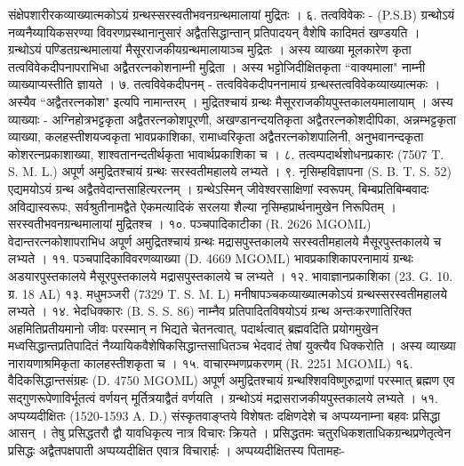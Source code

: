 संक्षेपशारीरकव्याख्यात्मकोऽयं ग्रन्थस्सरस्वतीभवनग्रन्थमालायां मुद्रितः ।
६. तत्वविवेकः - (P.S.B)
ग्रन्थोऽयं नव्यनैय्यायिकसरण्या विवरणप्रस्थानानुसारं अद्वैतसिद्धान्तान् प्रतिपादयन् वैशेषि कादिमतं खण्डयति । ग्रन्थोऽयं पण्डितग्रन्थमालायां मैसूरराजकीयग्रन्थमालायाञ्च मुद्रितः । अस्य व्याख्या मूलकारेण कृता तत्वविवेकदीपनापराभिधा अद्वैतरत्नकोशनाम्नी मुद्रिता । अस्य भट्टोजिदीक्षितकृता ``वाक्यमाला" नाम्नी व्याख्याप्यस्तीति ज्ञायते ।
७. तत्वविवेकदीपनम् -
तत्वविवेकदीपननामायं ग्रन्थस्तत्वविवेकव्याख्यात्मकः । अस्यैव ``अद्वैतरत्नकोश" इत्यपि नामान्तरम् । मुद्रितश्चायं ग्रन्थः मैसूरराजकीयपुस्तकालयमालायाम् । अस्य व्याख्याः - अग्निहोत्रभट्टकृता अद्वैतरत्नकोशपूरणी, अखण्डानन्दयतिकृता अद्वैतरत्नकोशदीपिका, अन्नम्भट्टकृता व्याख्या, कलहस्तीशयज्वकृता भावप्रकाशिका, रामाध्वरिकृता अद्वैतरत्नकोशपालिनी, अनुभवानन्दकृता कोशरत्नप्रकाशाख्या, शाश्वतानन्दतीर्थकृता भावार्थप्रकाशिका च ।
८. तत्वम्पदार्थशोधनप्रकारः (7507 T. S. M. L.) अपूर्ण अमुद्रितश्चायं ग्रन्थः सरस्वतीमहालये लभ्यते ।
९. नृसिम्हविज्ञापना (S. B. T. S. 52)
एद्यमयोऽयं ग्रन्थ अद्वैतवेदान्तसाहित्यरत्नम् । ग्रन्थेऽस्मिन् जीवेश्वरसाक्षिणां स्वरूपम्, बिम्बप्रतिबिम्बवादः अविद्यास्वरूपः, सर्वश्रुतीनामद्वैते ऐकमत्यादिकं सरलया शैल्या नृसिम्हप्रार्थनामुखेन निरूपितम् । सरस्वतीभवनग्रन्थमालायां मुद्रितश्च ।
१०. पञ्चपादिकाटीका (R. 2626 MGOML)
वेदान्तरत्नकोशापराभिध अपूर्ण अमुद्रितश्चायं ग्रन्थः मद्रासपुस्तकालये सरस्वतीमहालये मैसूरपुस्तकालये च लभ्यते ।
११. पञ्चपादिकाविवरणव्याख्या (D. 4669 MGOML)
भावप्रकाशिकापरनामायं ग्रन्थः अडयारपुस्तकालये मैसूरपुस्तकालये मद्रासपुस्तकालये च लभ्यते ।
१२. भावाज्ञानप्रकाशिका (23. G. 10. ग्र. 18 AL)
१३. मधुमञ्जरी (7329 T. S. M. L)
मनीषापञ्चकव्याख्यात्मकोऽयं ग्रन्थस्सरस्वतीमहालये लभ्यते ।
१४. भेदधिक्कारः (B. S. S. 86)
नाम्नैव प्रतिपादितविषयोऽयं ग्रन्थ अन्तःकरणातिरिक्त अहमितिप्रतीयमानो जीवः परस्मान् न भिद्यते चेतनत्वात्, पदार्थत्वात् ब्रह्मवदिति प्रयोगमुखेन मध्वसिद्धान्तप्रतिपादितं नैय्यायिकवैशेषिकसिद्धान्तसाधितञ्च भेदवादं तेषां युक्त्यैव धिक्करोति । अस्य व्याख्या नारायणाश्रमिकृता कालहस्तीशकृता च ।
१५. वाचारम्भणप्रकरणम् (R. 2251 MGOML)
१६. वैदिकसिद्धान्तसंग्रहः (D. 4750 MGOML)
अपूर्ण अमुद्रितश्चायं ग्रन्थश्शिवविष्णुरुद्राणां परस्मात् ब्रह्मण एव सद्गुणरूपेणाविर्भूतत्वं वर्णयन् मूर्तित्रयाद्वैतं वर्णयति । ग्रन्थोऽयं मद्रासराजकीयपुस्तकालये लभ्यते ।
५१. अप्पय्यदीक्षितः (1520-1593 A. D.)
संस्कृतवाङ्प्तये विशेषतः दक्षिणदेशे च अप्पय्यनाम्ना बहवः प्रसिद्धा आसन् । तेषु प्रसिद्धतरौ द्वौ यावधिकृत्य नात्र विचारः क्रियते । प्रसिद्धतमः चतुरधिकशताधिकग्रन्थप्रणेतृत्वेन प्रसिद्धः अद्वैतपक्षपाती अप्पय्यदीक्षित एवात्र विचारार्हः ।
अप्पय्यदीक्षितस्य पितामहः-
